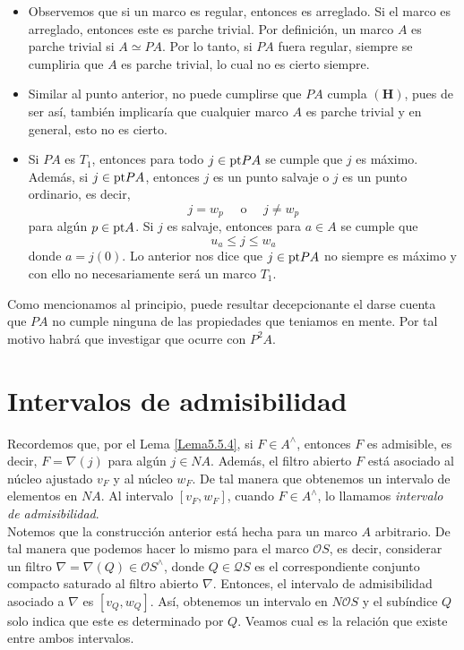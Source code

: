 \begin{itemize}
\item Observemos que si un marco es regular, entonces es arreglado. Si el marco es arreglado, entonces este es parche trivial. Por definición, un marco $A$ es parche trivial si $A\simeq PA$. Por lo tanto, si $PA$ fuera regular, siempre se cumpliria que $A$ es parche trivial, lo cual no es cierto siempre.
\item Similar al punto anterior, no puede cumplirse que $PA$ cumpla $\mathbf{(H)}$, pues de ser así, también implicaría que cualquier marco $A$ es parche trivial y en general, esto no es cierto.
\item Si $PA$ es $T_1$, entonces para todo $j\in \mathrm{pt} PA$ se cumple que $j$ es máximo. Además, si $j\in \mathrm{pt} PA$, entonces $j$ es un punto salvaje o $j$ es un punto ordinario, es decir,
\[
j=w_p\quad \mbox{ o }\quad j\neq w_p
\]
para algún $p\in \mathrm{pt} A$. Si $j$ es salvaje, entonces para $a\in A$ se cumple que 
\[
u_a\leq j\leq w_a
\]
donde $a=j(0)$. Lo anterior nos dice que $j\in \mathrm{pt} PA$ no siempre es máximo y con ello no necesariamente será un marco $T_1$.
\end{itemize}

Como mencionamos al principio, puede resultar decepcionante el darse cuenta que $PA$ no cumple ninguna de las propiedades que teniamos en mente. Por tal motivo habrá que investigar que ocurre con $P^2A$.

\section{Intervalos de admisibilidad}

Recordemos que, por el Lema \ref{Lema5.5.4}, si $F\in A^\wedge$, entonces $F$ es admisible, es decir, $F=\nabla(j)$ para algún $j\in NA$. Además, el filtro abierto $F$ está asociado al núcleo ajustado $v_F$ y al núcleo $w_F$. De tal manera que obtenemos un intervalo de elementos en $NA$. Al intervalo $[v_F, w_F]$, cuando $F\in A^\wedge$, lo llamamos \emph{intervalo de admisibilidad}.\\

Notemos que la construcción anterior está hecha para un marco $A$ arbitrario. De tal manera que podemos hacer lo mismo para el marco $\mathcal{O}S$, es decir, considerar un filtro $\nabla=\nabla(Q)\in \mathcal{O}S^\wedge$, donde $Q\in \mathcal{Q}S$ es el correspondiente conjunto compacto saturado al filtro abierto $\nabla$. Entonces, el intervalo de admisibilidad asociado a $\nabla$ es $[v_Q, w_Q]$. 
Así, obtenemos un intervalo en $N\mathcal{O}S$ y el subíndice $Q$ solo indica que este es determinado por $Q$. Veamos cual es la relación que existe entre ambos intervalos.

